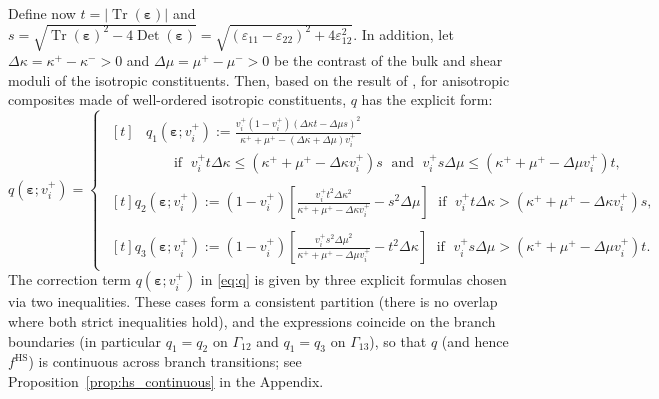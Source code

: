 \documentclass[preprint,3p]{elsarticle}
\newcommand{\tenss}[1]{\bm{\mathbf{#1}}}            %
\newcommand{\strain}{\tenss{\varepsilon}}           %
\newcommand{\Tr}{\operatorname{Tr}}
\newcommand{\Det}{\operatorname{Det}}
\begin{document}
Define now $t = \lvert \Tr(\strain) \rvert$ and $s = \sqrt{\Tr(\strain)^2 - 4 \Det(\strain)} = \sqrt{(\varepsilon_{11} - \varepsilon_{22})^2 + 4\varepsilon_{12}^2}$. In addition, let $\Delta \kappa = \kappa^+ - \kappa^- > 0$ and $\Delta \mu = \mu^+ - \mu^- > 0$ be the contrast of the bulk and shear moduli of the isotropic constituents. Then, based on the result of \citet[Proposition 2.3]{Allaire1993}, for anisotropic composites made of well-ordered isotropic constituents, $q$ has the explicit form:
%
\begin{equation}\label{eq:q}
q(\strain;v_i^+) = 
\begin{cases}
    \begin{aligned}[t]
        &q_1 (\strain; v_i^+):= \frac{v_i^{+}(1-v_i^{+}) \left(\Delta\kappa t - \Delta\mu s \right)^{2}}{\kappa^+ + \mu^+ -(\Delta \kappa + \Delta \mu)v_i^+}\\
        &\qquad\text{if }\; v_i^{+}t \Delta \kappa \le (\kappa^+ + \mu^+ - \Delta \kappa v_i^+) s 
        \;\text{ and }\; v_i^{+} s \Delta \mu \le (\kappa^+ + \mu^+ - \Delta \mu v_i^+) t,
    \end{aligned}\\
    \begin{aligned}[t]
        q_2 (\strain; v_i^+):= (1-v_i^+)\left[\frac{v_i^+ t^2 \Delta \kappa^2}{\kappa^+ + \mu^+ - \Delta\kappa v_i^+} - s^2\Delta\mu\right]
        \;\text{ if }\; v_i^{+}t \Delta \kappa > (\kappa^+ + \mu^+ - \Delta \kappa v_i^+) s,
    \end{aligned}\\
    \begin{aligned}[t]
        q_3 (\strain; v_i^+):= \left(1-{v_i^+}\right)\left[\frac{{v_i^+} s^2 {\Delta \mu}^2}{\kappa^+ + \mu^+ - \Delta \mu v_i^+}-t^2 \Delta\kappa\right] 
        \;\text{ if }\; v_i^{+} s \Delta \mu > (\kappa^{+} + \mu^{+} - \Delta \mu v_i^+) t.
    \end{aligned}
\end{cases}
\end{equation}
%
The correction term $q(\strain;v_i^+)$ in \eqref{eq:q} is given by three explicit formulas chosen via two inequalities. These cases form a consistent partition (there is no overlap where both strict inequalities hold), and the expressions coincide on the branch boundaries (in particular $q_1=q_2$ on $\Gamma_{12}$ and $q_1=q_3$ on $\Gamma_{13}$), so that $q$ (and hence $f^{\mathrm{HS}}$) is continuous across branch transitions; see Proposition~\ref{prop:hs_continuous} in the Appendix.
\end{document}
